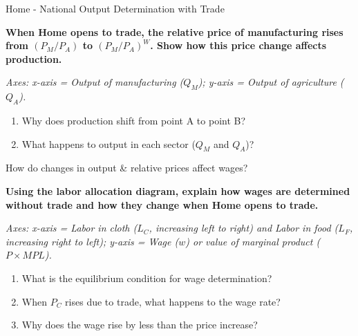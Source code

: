 \documentclass{beamer}
\begin{document}
\begin{frame}{Home - National Output Determination with Trade}

\textbf{When Home opens to trade, the relative price of manufacturing rises from $(P_M/P_A)$ to $(P_M/P_A)^W$. Show how this price change affects production.}

\vspace{0.2cm}

\textit{Axes: x-axis = Output of manufacturing ($Q_M$); y-axis = Output of agriculture ($Q_A$).}

\vspace{0.3cm}

\begin{enumerate}
    \item Why does production shift from point A to point B?
    \item What happens to output in each sector ($Q_M$ and $Q_A$)?
\end{enumerate}

\end{frame}


\begin{frame}{How do changes in output \& relative prices affect wages?}

\textbf{Using the labor allocation diagram, explain how wages are determined without trade and how they change when Home opens to trade.}

\vspace{0.2cm}

\textit{Axes: x-axis = Labor in cloth ($L_C$, increasing left to right) and Labor in food ($L_F$, increasing right to left); y-axis = Wage ($w$) or value of marginal product ($P \times MPL$).}

\vspace{0.3cm}

\begin{enumerate}
    \item What is the equilibrium condition for wage determination?
    \item When $P_C$ rises due to trade, what happens to the wage rate?
    \item Why does the wage rise by less than the price increase?
\end{enumerate}

\end{frame}
\end{document}
